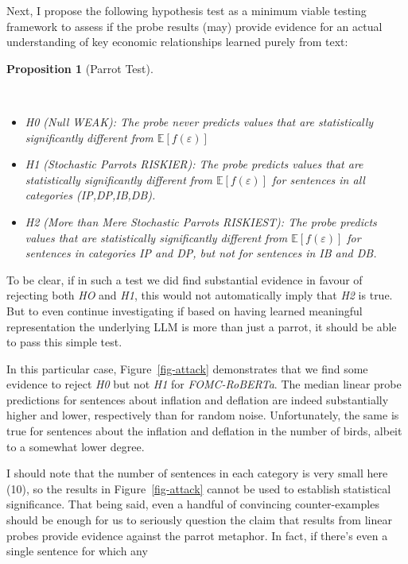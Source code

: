\documentclass[
  letterpaper,
  DIV=11,
  numbers=noendperiod]{scrartcl}
\providecommand{\tightlist}{%
  \setlength{\itemsep}{0pt}\setlength{\parskip}{0pt}}\usepackage{longtable,booktabs,array}
\theoremstyle{plain}
\newtheorem{proposition}{Proposition}[section]
\theoremstyle{remark}
\begin{document}
Next, I propose the following hypothesis test as a minimum viable
testing framework to assess if the probe results (may) provide evidence
for an actual understanding of key economic relationships learned purely
from text:

\begin{proposition}[Parrot
Test]\protect\hypertarget{prp-line}{}\label{prp-line}

~

\begin{itemize}
\tightlist
\item
  \emph{H0} (Null \emph{WEAK}): The probe never predicts values that are
  statistically significantly different from
  \(\mathbb{E}[f(\varepsilon)]\)
\item
  \emph{H1} (Stochastic Parrots \emph{RISKIER}): The probe predicts
  values that are statistically significantly different from
  \(\mathbb{E}[f(\varepsilon)]\) for sentences in all categories
  (IP,DP,IB,DB).
\item
  \emph{H2} (More than Mere Stochastic Parrots \emph{RISKIEST}): The
  probe predicts values that are statistically significantly different
  from \(\mathbb{E}[f(\varepsilon)]\) for sentences in categories IP and
  DP, but not for sentences in IB and DB.
\end{itemize}

\end{proposition}

To be clear, if in such a test we did find substantial evidence in
favour of rejecting both \emph{HO} and \emph{H1}, this would not
automatically imply that \emph{H2} is true. But to even continue
investigating if based on having learned meaningful representation the
underlying LLM is more than just a parrot, it should be able to pass
this simple test.

In this particular case, Figure~\ref{fig-attack} demonstrates that we
find some evidence to reject \emph{H0} but not \emph{H1} for
\emph{FOMC-RoBERTa}. The median linear probe predictions for sentences
about inflation and deflation are indeed substantially higher and lower,
respectively than for random noise. Unfortunately, the same is true for
sentences about the inflation and deflation in the number of birds,
albeit to a somewhat lower degree.

I should note that the number of sentences in each category is very
small here (10), so the results in Figure~\ref{fig-attack} cannot be
used to establish statistical significance. That being said, even a
handful of convincing counter-examples should be enough for us to
seriously question the claim that results from linear probes provide
evidence against the parrot metaphor. In fact, if there's even a single
sentence for which any
\end{document}
